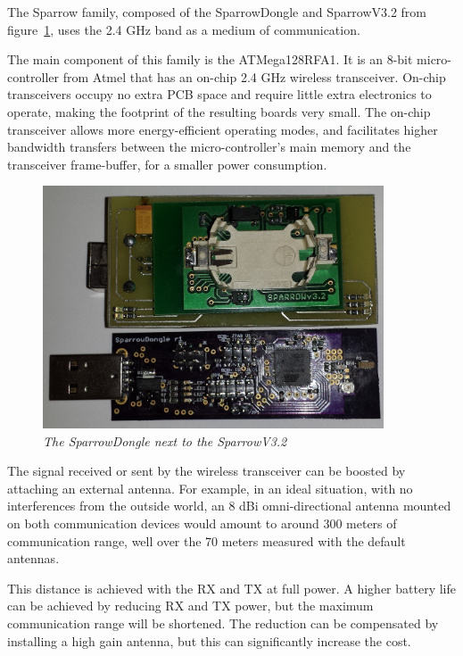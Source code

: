 The Sparrow family, composed of the SparrowDongle and SparrowV3.2 from figure~\ref{fig:sparrowfamily}, uses the 2.4 GHz band as a medium of communication. 
 

The main component of this family is the ATMega128RFA1. It is an 8-bit micro-controller from Atmel that has an on-chip 2.4 GHz wireless transceiver. On-chip transceivers occupy no extra PCB space and require little extra electronics to operate, making the footprint of the resulting boards very small. The on-chip transceiver allows more energy-efficient operating modes, and facilitates higher bandwidth transfers between the micro-controller's main memory and the transceiver frame-buffer, for a smaller power consumption.

\begin{figure}[ht]
  \label{fig:sparrowfamily}
\begin{center}
\includegraphics[width=0.9\textwidth]{img/sparrow.jpg}
\end{center}
\caption{\small \itshape{The SparrowDongle next to the SparrowV3.2}}
\end{figure}

The signal received or sent by the wireless transceiver can be boosted by attaching an external antenna. For example, in an ideal situation, with no interferences from the outside world, an 8 dBi omni-directional antenna mounted on both communication devices would amount to around 300 meters of communication range, well over the 70 meters measured with the default antennas.

This distance is achieved with the RX and TX at full power. A higher battery life can be achieved by reducing RX and TX power, but the maximum communication range will be shortened. The reduction can be compensated by installing a high gain antenna, but this can significantly increase the cost.


